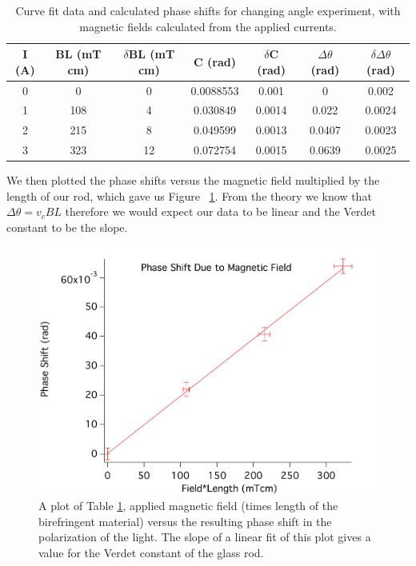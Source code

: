 \documentclass[prb,preprint]{revtex4-1}
\begin{document}
\begin{table}[h!]
\centering
\caption{Curve fit data and calculated phase shifts for changing angle experiment, with magnetic fields calculated from the applied currents.}
\begin{ruledtabular}
\begin{tabular}{c c c c c c c}
I (A) & BL (mT cm) & $\delta$BL (mT cm) & C (rad)& $\delta$C (rad) & $\Delta \theta$ (rad) & $\delta \Delta \theta$ (rad)\\
\hline	%
0 &  0  & 0 &  0.0088553 & 0.001 & 0 & 0.002    \\
1 & 108 & 4  & 0.030849  & 0.0014 & 0.022  & 0.0024 \\
2 & 215 & 8 & 0.049599  & 0.0013 & 0.0407 & 0.0023  \\
3 & 323 & 12 & 0.072754  & 0.0015 & 0.0639 & 0.0025 
\end{tabular}
\end{ruledtabular}
\label{B*L_PhaseShift_Table}
\end{table}

We then plotted the phase shifts versus the magnetic field multiplied by the length of our rod, which gave us Figure ~\ref{PhaseShift_B*L_Plot}. From the theory we know that $\Delta \theta = v_c B L$ therefore we would expect our data to be linear and the Verdet constant to be the slope.

\begin{figure}[h!]
\centering
\includegraphics[width=5in]{PhaseShift_B-L_Plot.pdf}
\caption{A plot of Table \ref{B*L_PhaseShift_Table}, applied magnetic field (times length of the birefringent material) versus the resulting phase shift in the polarization of the light. The slope of a linear fit of this plot gives a value for the Verdet constant of the glass rod. }
\label{PhaseShift_B*L_Plot}
\end{figure}
\end{document}
